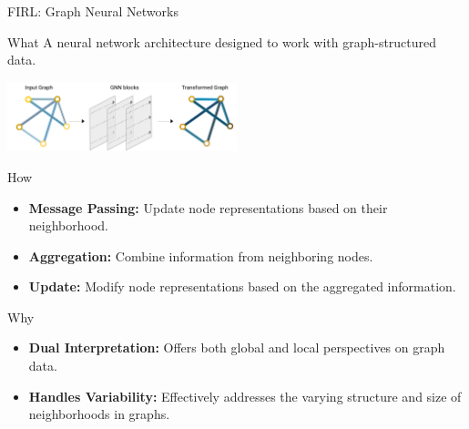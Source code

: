 \documentclass[presentation, 9pt,169]{beamer}\mode<presentation>{\usetheme{AMSBolognaFC}}
\begin{document}
\begin{frame}{FIRL: Graph Neural Networks}
  \begin{exampleblock}{What}
    A neural network architecture designed to work with graph-structured data.
  \end{exampleblock}

  \begin{center}
    \includegraphics[width=0.5\textwidth]{img/gnn.png}
  \end{center}

  \begin{block}{How}
    \begin{itemize}
      \item \textbf{Message Passing:} Update node representations based on their neighborhood.
      \item \textbf{Aggregation:} Combine information from neighboring nodes.
      \item \textbf{Update:} Modify node representations based on the aggregated information.
    \end{itemize}
  \end{block}

  \begin{alertblock}{Why}
    \begin{itemize}
      \item \textbf{Dual Interpretation:} Offers both global and local perspectives on graph data.
      \item \textbf{Handles Variability:} Effectively addresses the varying structure and size of neighborhoods in graphs.
    \end{itemize}
  \end{alertblock}
\end{frame}
\end{document}
